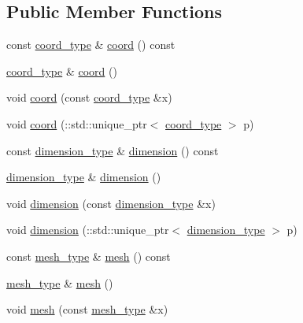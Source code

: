 \subsection*{Public Member Functions}
\begin{DoxyCompactItemize}
\item 
const \hyperlink{classcuboid__t_aa3c19ea94c59ed982641ca39a420a041}{coord\+\_\+type} \& \hyperlink{classcuboid__t_aa59d1259b69308fc019bd515501ce9c5}{coord} () const 
\item 
\hyperlink{classcuboid__t_aa3c19ea94c59ed982641ca39a420a041}{coord\+\_\+type} \& \hyperlink{classcuboid__t_a08bd56077bd7a5fa0b3a675db1ffb599}{coord} ()
\item 
void \hyperlink{classcuboid__t_afc00b4b51e918a973044a6dbf149e83b}{coord} (const \hyperlink{classcuboid__t_aa3c19ea94c59ed982641ca39a420a041}{coord\+\_\+type} \&x)
\item 
void \hyperlink{classcuboid__t_a5b52cff02eedff7b6e09753cde98add2}{coord} (\+::std\+::unique\+\_\+ptr$<$ \hyperlink{classcuboid__t_aa3c19ea94c59ed982641ca39a420a041}{coord\+\_\+type} $>$ p)
\item 
const \hyperlink{classcuboid__t_a0992ec1724eb71e76babf752bbe9189b}{dimension\+\_\+type} \& \hyperlink{classcuboid__t_a26f2220ad94483e4b94a930cf1983d9f}{dimension} () const 
\item 
\hyperlink{classcuboid__t_a0992ec1724eb71e76babf752bbe9189b}{dimension\+\_\+type} \& \hyperlink{classcuboid__t_aea33ff632180a4a3e6d6610f51d0877b}{dimension} ()
\item 
void \hyperlink{classcuboid__t_a3410f77c6419273a2b2205af00778432}{dimension} (const \hyperlink{classcuboid__t_a0992ec1724eb71e76babf752bbe9189b}{dimension\+\_\+type} \&x)
\item 
void \hyperlink{classcuboid__t_aa193e0ba063d2df2555a0c5ddaf775c2}{dimension} (\+::std\+::unique\+\_\+ptr$<$ \hyperlink{classcuboid__t_a0992ec1724eb71e76babf752bbe9189b}{dimension\+\_\+type} $>$ p)
\item 
const \hyperlink{classcuboid__t_a48025da79e9243b8b1e34e696c22e06d}{mesh\+\_\+type} \& \hyperlink{classcuboid__t_ab342d2b7cefd9e06ba5071c8154e2d06}{mesh} () const 
\item 
\hyperlink{classcuboid__t_a48025da79e9243b8b1e34e696c22e06d}{mesh\+\_\+type} \& \hyperlink{classcuboid__t_a25e6df90635b65b85ecbf068ba917885}{mesh} ()
\item 
void \hyperlink{classcuboid__t_acafe29403b610ef652d69291bc1640c5}{mesh} (const \hyperlink{classcuboid__t_a48025da79e9243b8b1e34e696c22e06d}{mesh\+\_\+type} \&x)

\end{DoxyCompactItemize}
